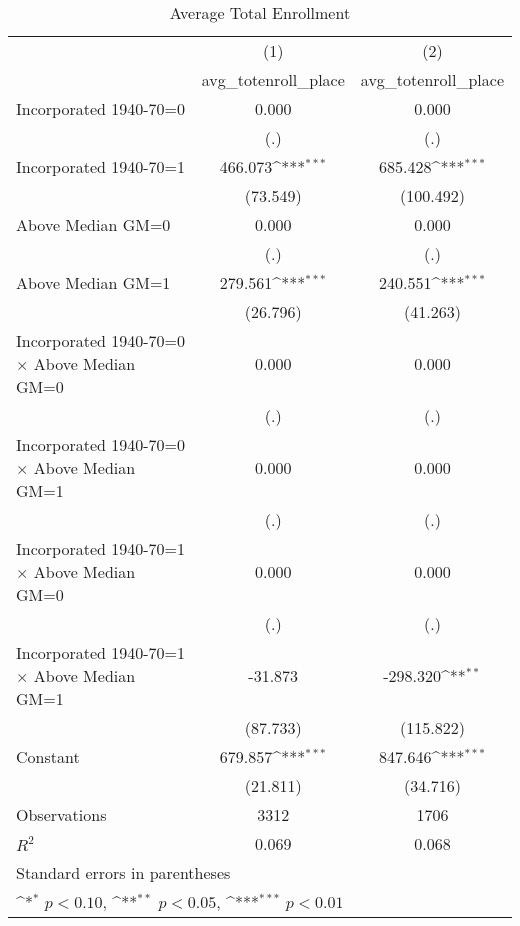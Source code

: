 \begin{table}[htbp]\centering
\def\sym#1{\ifmmode^{#1}\else\(^{#1}\)\fi}
\caption{Average Total Enrollment}
\begin{tabular}{l*{2}{c}}
\hline\hline
                    &\multicolumn{1}{c}{(1)}&\multicolumn{1}{c}{(2)}\\
                    &\multicolumn{1}{c}{avg\_totenroll\_place}&\multicolumn{1}{c}{avg\_totenroll\_place}\\
\hline
Incorporated 1940-70=0&       0.000         &       0.000         \\
                    &         (.)         &         (.)         \\
[1em]
Incorporated 1940-70=1&     466.073\sym{***}&     685.428\sym{***}\\
                    &    (73.549)         &   (100.492)         \\
[1em]
Above Median GM=0   &       0.000         &       0.000         \\
                    &         (.)         &         (.)         \\
[1em]
Above Median GM=1   &     279.561\sym{***}&     240.551\sym{***}\\
                    &    (26.796)         &    (41.263)         \\
[1em]
Incorporated 1940-70=0 $\times$ Above Median GM=0&       0.000         &       0.000         \\
                    &         (.)         &         (.)         \\
[1em]
Incorporated 1940-70=0 $\times$ Above Median GM=1&       0.000         &       0.000         \\
                    &         (.)         &         (.)         \\
[1em]
Incorporated 1940-70=1 $\times$ Above Median GM=0&       0.000         &       0.000         \\
                    &         (.)         &         (.)         \\
[1em]
Incorporated 1940-70=1 $\times$ Above Median GM=1&     -31.873         &    -298.320\sym{**} \\
                    &    (87.733)         &   (115.822)         \\
[1em]
Constant            &     679.857\sym{***}&     847.646\sym{***}\\
                    &    (21.811)         &    (34.716)         \\
\hline
Observations        &        3312         &        1706         \\
\(R^{2}\)           &       0.069         &       0.068         \\
\hline\hline
\multicolumn{3}{l}{\footnotesize Standard errors in parentheses}\\
\multicolumn{3}{l}{\footnotesize \sym{*} \(p<0.10\), \sym{**} \(p<0.05\), \sym{***} \(p<0.01\)}\\
\end{tabular}
\end{table}

